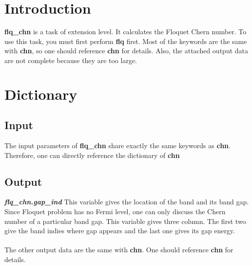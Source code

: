 \documentclass[10pt,a4paper]{article}
\begin{document}
\section{Introduction}
\textbf{flq\_chn} is a task of extension level. It calculates the Floquet Chern number. To use this task, you must first perform \textbf{flq} first. Most of the keywords are the same with \textbf{chn}, so one should reference \textbf{chn} for details. Also, the attached output data are not complete because they are too large. 

\section{Dictionary}

\subsection{Input}
 The input parameters of \textbf{flq\_chn} share exactly the same keywords as \textbf{chn}. Therefore, one can directly reference the dictionary of \textbf{chn}

\subsection{Output}
\textit{\textbf{flq\_chn.gap\_ind}} This variable gives the location of the band and its band gap. Since Floquet problem has no Fermi level, one can only discuss the Chern number of a particular band gap. This variable gives three column. The first two give the band indies where gap appears and the last one gives its gap energy.\\ \\
The other output data are the same with \textbf{chn}. One should reference \textbf{chn} for details.
 \\ \\
 \\ \\
 \\ \\
 \\ \\
  \\ \\
  \\ \\
 \\ \\
 \\ \\
 \\ \\
 \\ \\
  \\ \\
  \\ \\
  \\ \\
  \\ 
  
\end{document}
